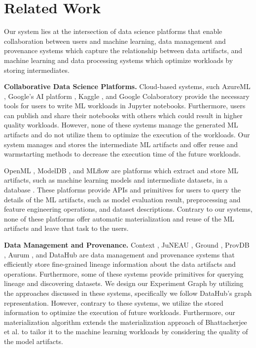 \section{Related Work} \label{sec-related-work}
Our system lies at the intersection of data science platforms that enable collaboration between users and machine learning, data management and provenance systems which capture the relationship between data artifacts, and machine learning and data processing systems which optimize workloads by storing intermediates.

\textbf{Collaborative Data Science Platforms.}
Cloud-based systems, such AzureML \cite{team2016azureml}, Google's AI platform \cite{googleai}, Kaggle \cite{kagglewebsite}, and Google Colaboratory \cite{googlecolab} provide the necessary tools for users to write ML workloads in Jupyter notebooks.
Furthermore, users can publish and share their notebooks with others which could result in higher quality workloads.
However, none of these systems manage the generated ML artifacts and do not utilize them to optimize the execution of the workloads.
Our system manages and stores the intermediate ML artifacts and offer reuse and warmstarting methods to decrease the execution time of the future workloads.

OpenML \cite{vanschoren2014openml}, ModelDB \cite{vartak2016m}, and MLflow \cite{zaharia2018accelerating} are platforms which extract and store ML artifacts, such as machine learning models and intermediate datasets, in a database \cite{schelter2017automatically, Vanschoren2012}.
These platforms provide APIs and primitives for users to query the details of the ML artifacts, such as model evaluation result, preprocessing and feature engineering operations, and dataset descriptions.
Contrary to our systems, none of these platforms offer automatic materialization and reuse of the ML artifacts and leave that task to the users.

\textbf{Data Management and Provenance.}
Context \cite{garcia2018context}, JuNEAU \cite{ives2019dataset}, Ground \cite{hellerstein2017ground}, ProvDB \cite{miao2018provdb}, Aurum \cite{fernandez2018aurum}, and DataHub \cite{bhardwaj2014datahub, bhattacherjee2015principles} are data management and provenance systems that efficiently store fine-grained lineage information about the data artifacts and operations.
Furthermore, some of these systems provide primitives for querying lineage and discovering datasets.
We design our Experiment Graph by utilizing the approaches discussed in these systems, specifically we follow DataHub's graph representation.
However, contrary to these systems, we utilize the stored information to optimize the execution of future workloads.
Furthermore, our materialization algorithm extends the materialization approach of Bhattacherjee et al. \cite{bhattacherjee2015principles} to tailor it to the machine learning workloads by considering the quality of the model artifacts.

